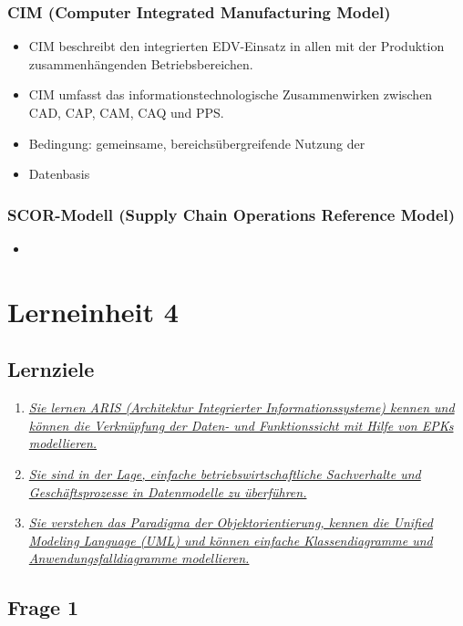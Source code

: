 \documentclass[a4paper]{article}
\begin{document}
\subsubsection*{CIM (Computer Integrated Manufacturing Model)}
\begin{itemize}
	\item CIM beschreibt den integrierten EDV-Einsatz in allen mit der Produktion zusammenhängenden Betriebsbereichen.
	\item CIM umfasst das informationstechnologische Zusammenwirken zwischen CAD, CAP, CAM, CAQ und PPS.
	\item Bedingung: gemeinsame, bereichsübergreifende Nutzung der
	\item Datenbasis
\end{itemize}

\subsubsection*{SCOR-Modell (Supply Chain Operations Reference Model)}
\begin{itemize}
	\item 
\end{itemize}

\section*{Lerneinheit 4}
\subsection*{Lernziele}
\begin{enumerate}
	\item \hyperref[le4-1]{\textit{Sie lernen ARIS (Architektur Integrierter Informationssysteme) kennen und können die Verknüpfung der Daten- und Funktionssicht mit Hilfe von EPKs modellieren.}}
	\item \hyperref[le4-2]{\textit{Sie sind in der Lage, einfache betriebswirtschaftliche Sachverhalte und Geschäftsprozesse in Datenmodelle zu überführen.}}
	\item \hyperref[le4-3]{\textit{Sie verstehen das Paradigma der Objektorientierung, kennen die Unified Modeling Language (UML) und können einfache Klassendiagramme und Anwendungsfalldiagramme modellieren.}}
\end{enumerate}

\subsection*{Frage 1}
\end{document}
